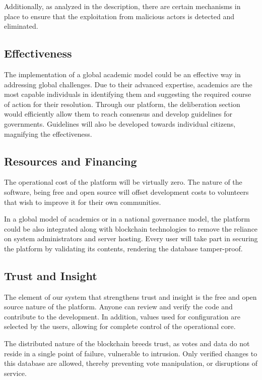\documentclass[a4paper,11pt]{article}
\begin{document}
\begin{multicols}{2}
Additionally, as analyzed in the description, there are certain mechanisms in place to ensure that the exploitation from malicious actors is detected and eliminated.

\subsection{Effectiveness} \label{effectiveness}

The implementation of a global academic model could be an effective way in addressing global challenges. Due to their advanced expertise, academics are the most capable individuals in identifying them and suggesting the required course of action for their resolution. Through our platform, the deliberation section would efficiently allow them to reach consensus and develop guidelines for governments. Guidelines will also be developed towards individual citizens, magnifying the effectiveness.

\subsection{Resources and Financing} \label{resources}

The operational cost of the platform will be virtually zero. The nature of the software, being free and open source will offset development costs to volunteers that wish to improve it for their own communities.

In a global model of academics or in a national governance model, the platform could be also integrated along with blockchain technologies to remove the reliance on system administrators and server hosting. Every user will take part in securing the platform by validating its contents, rendering the database tamper-proof.

\subsection{Trust and Insight} \label{trust}

The element of our system that strengthens trust and insight is the free and open source nature of the platform. Anyone can review and verify the code and contribute to the development. In addition, values used for configuration are selected by the users, allowing for complete control of the operational core.

The distributed nature of the blockchain breeds trust, as votes and data do not reside in a single point of failure, vulnerable to intrusion. Only verified changes to this database are allowed, thereby preventing vote manipulation, or disruptions of service.


\end{multicols}
\end{document}
